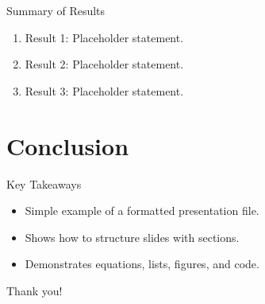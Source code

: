 \documentclass{presentation}
\begin{document}
\begin{frame}{Summary of Results}
    \begin{enumerate}
        \item Result 1: Placeholder statement.
        \item Result 2: Placeholder statement.
        \item Result 3: Placeholder statement.
    \end{enumerate}
\end{frame}

\section{Conclusion}

\begin{frame}{Key Takeaways}
    \begin{itemize}
        \item Simple example of a formatted presentation file.
        \item Shows how to structure slides with sections.
        \item Demonstrates equations, lists, figures, and code.
    \end{itemize}
\end{frame}

\begin{frame}
    \centering
    \Large Thank you!
\end{frame}
\end{document}
